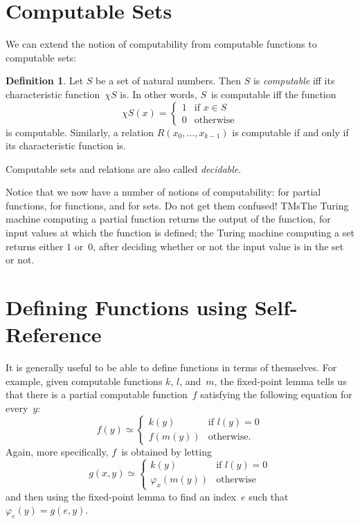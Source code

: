 \documentclass[10pt,a4paper]{article}
\theoremstyle{plain}
\theoremstyle{definition}
\newtheorem{defn}[thm]{Definition}
\theoremstyle{remark}
\newenvironment{explain}{}{}
\newcommand*{\olfileid}[3]{}
\newcommand*{\olsection}[1]{\section*{#1}}
\newcommand*{\olimport}[1]{}
\providecommand{\cfind}[1]{\varphi_{#1}}
\providecommand{\iftag}[1]{#1}
\providecommand{\Char}{\chi}
\providecommand{\iftag}{}
\begin{document}
\olimport{fixed-point-thm}

\olimport{application-fixed-point}

\olimport{def-functions-self-reference}

\OLEndChapterHook





\olfileid{cmp}{thy}{cps}
\olsection{Computable Sets}

We can extend the notion of computability from computable functions to
computable sets:

\begin{defn}
  Let $S$ be a set of natural numbers. Then $S$ is \emph{computable}
  iff its characteristic function~$\Char{S}$ is. In other words,
  $S$~is computable iff the function
\[
\Char{S}(x) =
\begin{cases}
1 & \text{if $x \in S$} \\
0 & \text{otherwise}
\end{cases}
\]
is computable. Similarly, a relation $R(x_0, \dots, x_{k-1})$ is
computable if and only if its characteristic function is.

Computable sets and relations are also called \emph{decidable}.
\end{defn}

\begin{explain}
Notice that we now have a number of notions of computability: for
partial functions, for functions, and for sets. Do not get them
confused!{} \iftag{TMs}{The Turing machine computing a partial function
  returns the output of the function, for input values at which the
  function is defined; the Turing machine computing a set returns
  either $1$ or~$0$, after deciding whether or not the input value is in
  the set or not.}{}
\end{explain}





\olfileid{cmp}{thy}{slf}
\olsection{Defining Functions using Self-Reference}

It is generally useful to be able to define functions in terms of
themselves. For example, given computable functions $k$, $l$, and~$m$,
the fixed-point lemma tells us that there is a partial computable
function~$f$ satisfying the following equation for every~$y$:
\[
f(y) \simeq
\begin{cases}
k(y) & \text{if $l(y) = 0$} \\
f(m(y)) & \text{otherwise.}
\end{cases}
\]
Again, more specifically, $f$~is obtained by letting
\[
g(x,y) \simeq
\begin{cases}
k(y) & \text{if $l(y) = 0$} \\
\cfind{x}(m(y)) & \text{otherwise}
\end{cases}
\]
and then using the fixed-point lemma to find an index~$e$ such that
$\cfind{e}(y) = g(e,y)$.
\end{document}
